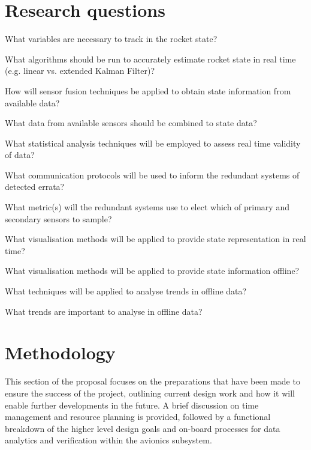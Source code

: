 \section{Research questions}
\begin{questions}
  \item What variables are necessary to track in the rocket state?
  \item What algorithms should be run to accurately estimate rocket state in real time (e.g. linear vs. extended Kalman Filter)?
  \item How will sensor fusion techniques be applied to obtain state information from available data? \begin{questions}
    \item What data from available sensors should be combined to state data?
  \end{questions}
  \item What statistical analysis techniques will be employed to assess real time validity of data? \begin{questions}
    \item What communication protocols will be used to inform the redundant systems of detected errata?
    \item What metric(s) will the redundant systems use to elect which of primary and secondary sensors to sample?
  \end{questions}
  \item What visualisation methods will be applied to provide state representation in real time?
  \item What visualisation methods will be applied to provide state information offline? \begin{questions}
    \item What techniques will be applied to analyse trends in offline data? 
    \item What trends are important to analyse in offline data?
  \end{questions}
\end{questions}

\section{Methodology}
This section of the proposal focuses on the preparations that have been made to ensure the success of the project, outlining current design work and how it will enable further developments in the future. A brief discussion on time management and resource planning is provided, followed by a functional breakdown of the higher level design goals and on-board processes for data analytics and verification within the avionics subsystem. 

